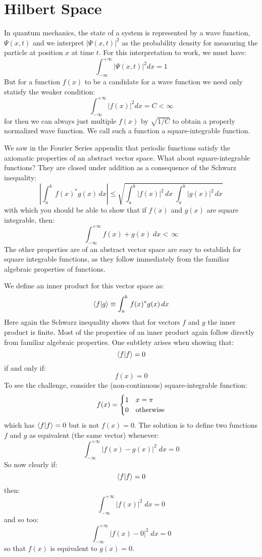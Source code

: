 \documentclass[12pt]{book}
\begin{document}
\section{Hilbert Space}

In quantum mechanics, the state of a system is represented by a wave function, $\Psi(x,t)$ and we interpret $|\Psi(x,t)|^2$ as the probability density for measuring the particle at position $x$ at time $t$.  For this interpretation to work, we must have:
$$\int_{-\infty}^{+\infty} |\Psi(x,t)|^2 dx = 1$$
But for a function $f(x)$ to be a candidate for a wave function we need only statisfy the weaker condition:
$$\int_{-\infty}^{+\infty} |f(x)|^2 dx = C < \infty$$
for then we can always just multiple $f(x)$ by $\sqrt{1/C}$ to obtain a properly normalized wave function.  We call such a function a square-integrable function.

We saw in the Fourier Series appendix that periodic functions satisfy the axiomatic properties of an abstract vector space.  What about square-integrable functions?  They are closed under addition as a consequence of the Schwarz inequality:
\begin{equation}
\left|\int_a^b \, f(x)^* g(x) \, dx\right| \leq \sqrt{\int_a^b |f(x)|^2 \, dx \; \int_a^b |g(x)|^2 \, dx}
\end{equation}
with which you should be able to show that if $f(x)$ and $g(x)$ are square integrable, then:
$$\int_{-\infty}^{+\infty} f(x) + g(x) \; dx < \, \infty$$
The other properties are of an abstract vector space are easy to establish for square integrable functions, as they follow immediately from the familiar algebraic properties of functions. 

We define an inner product for this vector space as:
$$\braket{f|g} \equiv \int_a^b \, f(x)^* g(x) \, dx$$
Here again the Schwarz inequality shows that for vectors $f$ and $g$ the inner product is finite.  Most of the properties of an inner product again follow directly from familiar algebraic properties.  One subtlety arises when showing that:
$$\braket{f|f}=0$$
if and only if:
$$f(x)=0$$
To see the challenge, consider the (non-continuous) square-integrable function:
$$f(x)=
\begin{cases}
1 & x=\pi \\
0 & {\rm otherwise} \\
\end{cases}
$$
which has $\braket{f|f}=0$ but is not $f(x)=0$.  The solution is to define two functions $f$ and $g$ as equivalent (the same vector) whenever:
$$\int_{-\infty}^{+\infty} |f(x) - g(x)|^2 \; dx = 0 $$
So now clearly if:
$$\braket{f|f} = 0$$
then:
$$\int_{-\infty}^{+\infty} |f(x)|^2 \; dx = 0 $$
and so too:
$$\int_{-\infty}^{+\infty} |f(x) - 0|^2 \; dx = 0 $$
so that $f(x)$ is equivalent to $g(x)=0$.
\end{document}
